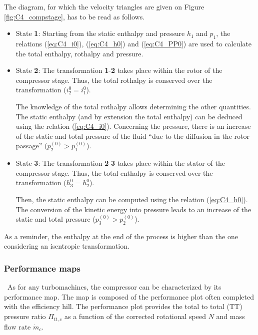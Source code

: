 The diagram, for which the velocity triangles are given on Figure \ref{fig:C4_compstage}, has to be read as follows.
\begin{itemize}
    \item State \textbf{1}: Starting from the static enthalpy and pressure \(h_1\) and \(p_1\), the relations (\ref{eq:C4_i0}), (\ref{eq:C4_h0}) and (\ref{eq:C4_PP0}) are used to calculate the total enthalpy, rothalpy and pressure.
    \item State \textbf{2}: The transformation \textbf{1}-\textbf{2} takes place within the rotor of the compressor stage. Thus, the total rothalpy is conserved over the transformation ($i_2^0=i_1^0$).

    The knowledge of the total rothalpy allows determining the other quantities. The static enthalpy (and by extension the total enthalpy) can be deduced using the relation (\ref{eq:C4_i0}). Concerning the pressure, there is an increase of the static and total pressure of the fluid “due to the diffusion in the rotor passage” \cite{Hillewaert2019} ($p_2^{(0)} > p_1^{(0)}$).

    \item State \textbf{3}: The transformation \textbf{2}-\textbf{3} takes place within the stator of the compressor stage. Thus, the total enthalpy is conserved over the transformation ($h_3^0 = h_2^0$).

    Then, the static enthalpy can be computed using the relation (\ref{eq:C4_h0}). The conversion of the kinetic energy into pressure leads to an increase of the static and total pressure ($p_3^{(0)} > p_2^{(0)}$).
\end{itemize}
As a reminder, the enthalpy at the end of the process is higher than the one considering an isentropic transformation.
\subsubsection{Performance maps}
\quad\ As for any turbomachines, the compressor can be characterized by its performance map. The map is composed of the performance plot often completed with the efficiency hill. The performance plot provides the total to total (TT) pressure ratio \(\Pi_{tt,c}\) as a function of the corrected rotational speed \(N\) and mass flow rate \(\dot{m}_c\).

